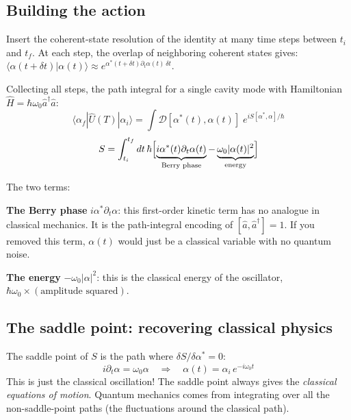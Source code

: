 \documentclass[12pt]{article}
\newcommand{\bra}[1]{\langle #1 |}
\newcommand{\ket}[1]{| #1 \rangle}
\begin{document}
\subsection{Building the action}

Insert the coherent-state resolution of the identity at many time
steps between $t_i$ and $t_f$. At each step, the overlap of
neighboring coherent states gives:
$\bra{\alpha(t+\delta t)}\alpha(t)\rangle \approx
e^{\alpha^*(t+\delta t)\partial_t\alpha(t)\,\delta t}$.

Collecting all steps, the path integral for a single cavity mode
with Hamiltonian $\hat{H} = \hbar\omega_0\hat{a}^\dagger\hat{a}$:
\begin{equation}
  \bra{\alpha_f}\hat{U}(T)\ket{\alpha_i} =
  \int\mathcal{D}[\alpha^*(t),\alpha(t)]\;e^{iS[\alpha^*,\alpha]/\hbar}
\end{equation}
\begin{equation}
  S = \int_{t_i}^{t_f} dt\,\hbar\Bigl[
  \underbrace{i\alpha^*(t)\partial_t\alpha(t)}_{\text{Berry phase}}
  - \underbrace{\omega_0|\alpha(t)|^2}_{\text{energy}}
  \Bigr]
  \label{eq:action_field}
\end{equation}

The two terms:

\textbf{The Berry phase} $i\alpha^*\partial_t\alpha$: this
first-order kinetic term has no analogue in classical mechanics.
It is the path-integral encoding of $[\hat{a},\hat{a}^\dagger]=1$.
If you removed this term, $\alpha(t)$ would just be a classical
variable with no quantum noise.

\textbf{The energy} $-\omega_0|\alpha|^2$: this is the classical
energy of the oscillator, $\hbar\omega_0\times(\text{amplitude squared})$.

\subsection{The saddle point: recovering classical physics}

The saddle point of $S$ is the path where $\delta S/\delta\alpha^* = 0$:
\begin{equation}
  i\partial_t\alpha = \omega_0\alpha
  \quad\Rightarrow\quad
  \alpha(t) = \alpha_i\,e^{-i\omega_0 t}
\end{equation}
This is just the classical oscillation! The saddle point always
gives the \emph{classical equations of motion}. Quantum mechanics
comes from integrating over all the non-saddle-point paths
(the fluctuations around the classical path).
\end{document}
